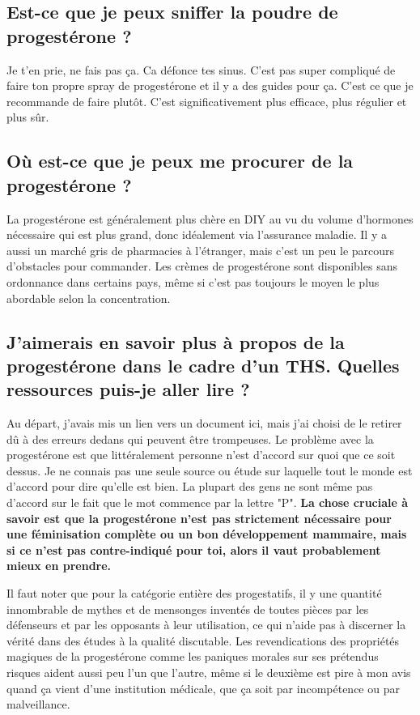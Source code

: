 \documentclass{article}
\begin{document}
\subsection{Est-ce que je peux sniffer la poudre de progestérone ?}

Je t'en prie, ne fais pas ça. Ca défonce tes sinus. C'est pas super compliqué de faire ton propre spray de progestérone et il y a des guides pour ça. C'est ce que je recommande de faire plutôt. C'est significativement plus efficace, plus régulier et plus sûr.

\subsection{Où est-ce que je peux me procurer de la progestérone ?}

La progestérone est généralement plus chère en DIY au vu du volume d'hormones nécessaire qui est plus grand, donc idéalement via l'assurance maladie. Il y a aussi un marché gris de pharmacies à l'étranger, mais c'est un peu le parcours d'obstacles pour commander. Les crèmes de progestérone sont disponibles sans ordonnance dans certains pays, même si c'est pas toujours le moyen le plus abordable selon la concentration.

\subsection{J'aimerais en savoir plus à propos de la progestérone dans le cadre d'un THS. Quelles ressources puis-je aller lire ?}\label{8-17}

Au départ, j'avais mis un lien vers un document ici, mais j'ai choisi de le retirer dû à des erreurs dedans qui peuvent être trompeuses. Le problème avec la progestérone est que littéralement personne n'est d'accord sur quoi que ce soit dessus. Je ne connais pas une seule source ou étude sur laquelle tout le monde est d'accord pour dire qu'elle est bien. La plupart des gens ne sont même pas d'accord sur le fait que le mot commence par la lettre "P". \textbf{La chose cruciale à savoir est que la progestérone n'est pas strictement nécessaire pour une féminisation complète ou un bon développement mammaire, mais si ce n'est pas contre-indiqué pour toi, alors il vaut probablement mieux en prendre.}

Il faut noter que pour la catégorie entière des progestatifs, il y une quantité innombrable de mythes et de mensonges inventés de toutes pièces par les défenseurs et par les opposants à leur utilisation, ce qui n'aide pas à discerner la vérité dans des études à la qualité discutable. Les revendications des propriétés magiques de la progestérone comme les paniques morales sur ses prétendus risques aident aussi peu l'un que l'autre, même si le deuxième est pire à mon avis quand ça vient d'une institution médicale, que ça soit par incompétence ou par malveillance.
\end{document}
